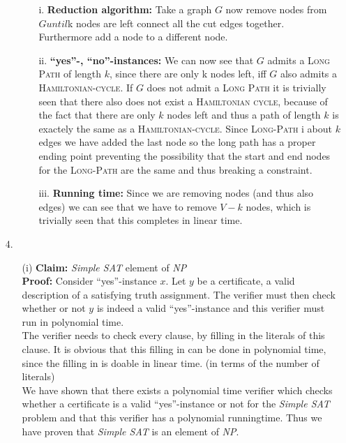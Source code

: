 \documentclass{article}
\begin{document}
\begin{itemize}
\begin{itemize}
\begin{itemize}

\item[i.] \textbf{Reduction algorithm:} Take a graph $G$ now remove nodes from $G until $k nodes are left connect all the cut edges together. Furthermore add a node to a different node.

\item[ii.] \textbf{``yes''-, ``no''-instances:} We can now see that $G$ admits a \textsc{Long Path} of length $k$, since there are only k nodes left, iff $G$ also admits a \textsc{Hamiltonian-cycle}. If $G$ does not admit a \textsc{Long Path} it is trivially seen that there also does not exist a \textsc{Hamiltonian cycle}, because of the fact that there are only $k$ nodes left and thus a path of length $k$ is exactely the same as a \textsc{Hamiltonian-cycle}. Since \textsc{Long-Path} i about $k$ edges we have added the last node so the long path has a proper ending point preventing the possibility that the start and end nodes for the \textsc{Long-Path} are the same and thus breaking a constraint.

\item[iii.] \textbf{Running time:} Since we are removing nodes (and thus also edges) we can see that we have to remove $V-k$ nodes, which is trivially seen that this completes in linear time.

\end{itemize}
\end{itemize}

\item[4.]
\begin{itemize}
\item[(i)]\textbf{Claim:} \emph{Simple SAT} element of \emph{NP}\\
\textbf{Proof:} Consider ``yes''-instance $x$. Let $y$ be a certificate, a valid description of a satisfying truth assignment. The verifier must then check whether or not $y$ is indeed a valid ``yes''-instance and this verifier must run in polynomial time. \\

The verifier needs to check every clause, by filling in the literals of this clause. It is obvious that this filling in can be done in polynomial time, since the filling in is doable in linear time. (in terms of the number of literals) \\

We have shown that there exists a polynomial time verifier which checks whether a certificate is a valid ``yes''-instance or not for the \emph{Simple SAT} problem and that this verifier has a polynomial runningtime. Thus we have proven that \emph{Simple SAT} is an element of \emph{NP}. 



\end{itemize}
\end{itemize}
\end{document}
